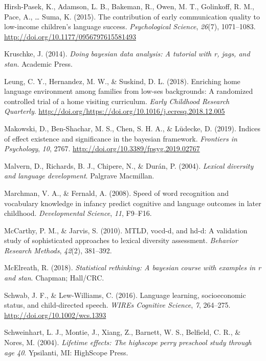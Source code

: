 \documentclass[man,floatsintext]{apa6}
\begin{document}
\leavevmode\hypertarget{ref-HirshPasek2015}{}%
Hirsh-Pasek, K., Adamson, L. B., Bakeman, R., Owen, M. T., Golinkoff, R. M., Pace, A., \ldots{} Suma, K. (2015). The contribution of early communication quality to low-income children's language success. \emph{Psychological Science}, \emph{26}(7), 1071--1083. \url{http://doi.org/10.1177/0956797615581493}

\leavevmode\hypertarget{ref-Kruschke2014}{}%
Kruschke, J. (2014). \emph{Doing bayesian data analysis: A tutorial with r, jags, and stan}. Academic Press.

\leavevmode\hypertarget{ref-Leung2018}{}%
Leung, C. Y., Hernandez, M. W., \& Suskind, D. L. (2018). Enriching home language environment among families from low-ses backgrounds: A randomized controlled trial of a home visiting curriculum. \emph{Early Childhood Research Quarterly}. \url{http://doi.org/https://doi.org/10.1016/j.ecresq.2018.12.005}

\leavevmode\hypertarget{ref-Makowski2019}{}%
Makowski, D., Ben-Shachar, M. S., Chen, S. H. A., \& Lüdecke, D. (2019). Indices of effect existence and significance in the bayesian framework. \emph{Frontiers in Psychology}, \emph{10}, 2767. \url{http://doi.org/10.3389/fpsyg.2019.02767}

\leavevmode\hypertarget{ref-Malvern2004}{}%
Malvern, D., Richards, B. J., Chipere, N., \& Durán, P. (2004). \emph{Lexical diversity and language development}. Palgrave Macmillan.

\leavevmode\hypertarget{ref-Marchman2008}{}%
Marchman, V. A., \& Fernald, A. (2008). Speed of word recognition and vocabulary knowledge in infancy predict cognitive and language outcomes in later childhood. \emph{Developmental Science}, \emph{11}, F9--F16.

\leavevmode\hypertarget{ref-McCarthy2010}{}%
McCarthy, P. M., \& Jarvis, S. (2010). MTLD, vocd-d, and hd-d: A validation study of sophisticated approaches to lexical diversity assessment. \emph{Behavior Research Methods}, \emph{42}(2), 381--392.

\leavevmode\hypertarget{ref-McElreath2018}{}%
McElreath, R. (2018). \emph{Statistical rethinking: A bayesian course with examples in r and stan}. Chapman; Hall/CRC.

\leavevmode\hypertarget{ref-Schwab2016}{}%
Schwab, J. F., \& Lew-Williams, C. (2016). Language learning, socioeconomic status, and child-directed speech. \emph{WIREs Cognitive Science}, \emph{7}, 264--275. \url{http://doi.org/10.1002/wcs.1393}

\leavevmode\hypertarget{ref-PerryPreschool2004}{}%
Schweinhart, L. J., Montie, J., Xiang, Z., Barnett, W. S., Belfield, C. R., \& Nores, M. (2004). \emph{Lifetime effects: The highscope perry preschool study through age 40}. Ypsilanti, MI: HighScope Press.
\end{document}
